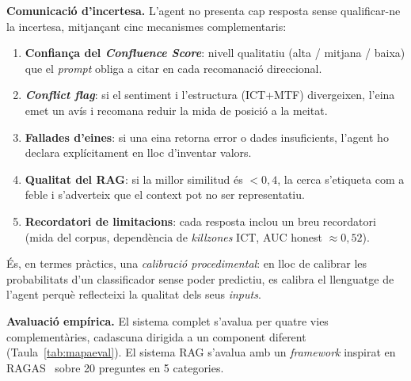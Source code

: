 \documentclass[10pt,twocolumn,a4paper]{article}
\begin{document}
\textbf{Comunicació d'incertesa.} L'agent no presenta cap resposta sense
qualificar-ne la incertesa, mitjançant cinc mecanismes complementaris:
\begin{enumerate}[leftmargin=1.1em,itemsep=1pt,topsep=2pt]
  \item \textbf{Confiança del \textit{Confluence Score}}: nivell qualitatiu
  (alta / mitjana / baixa) que el \textit{prompt} obliga a citar en cada
  recomanació direccional.
  \item \textbf{\textit{Conflict flag}}: si el sentiment i l'estructura (ICT+MTF)
  divergeixen, l'eina emet un avís i recomana reduir la mida de posició a la meitat.
  \item \textbf{Fallades d'eines}: si una eina retorna error o dades insuficients,
  l'agent ho declara explícitament en lloc d'inventar valors.
  \item \textbf{Qualitat del RAG}: si la millor similitud és $<0{,}4$, la cerca
  s'etiqueta com a feble i s'adverteix que el context pot no ser representatiu.
  \item \textbf{Recordatori de limitacions}: cada resposta inclou un breu recordatori
  (mida del corpus, dependència de \textit{killzones} ICT, AUC honest $\approx 0{,}52$).
\end{enumerate}
És, en termes pràctics, una \emph{calibració procedimental}: en lloc de calibrar
les probabilitats d'un classificador sense poder predictiu, es calibra el
llenguatge de l'agent perquè reflecteixi la qualitat dels seus \textit{inputs}.

\textbf{Avaluació empírica.} El sistema complet s'avalua per quatre vies
complementàries, cadascuna dirigida a un component diferent
(Taula~\ref{tab:mapaeval}). El sistema RAG s'avalua amb un \textit{framework}
inspirat en RAGAS~\cite{es2024} sobre 20 preguntes en 5 categories.
\end{document}
